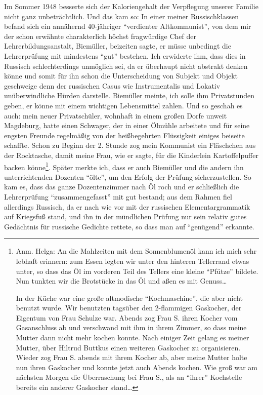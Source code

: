 Im Sommer 1948 besserte sich der Kaloriengehalt der Verpflegung unserer Familie nicht ganz unbeträchtlich. Und das kam so: In einer meiner Russischklassen befand sich ein annähernd 40-jähriger \enquote{verdienter Altkommunist}, von dem mir der schon erwähnte charakterlich höchst fragwürdige Chef der Lehrerbildungsanstalt, Biemüller, beizeiten sagte, er müsse unbedingt die Lehrerprüfung mit mindestens \enquote{gut} bestehen.  Ich erwiderte ihm, dass dies in Russisch schlechterdings unmöglich sei, da er überhaupt nicht abstrakt denken könne und somit für ihn schon die Unterscheidung von Subjekt und Objekt geschweige denn der russischen Casus wie Instrumentalis und Lokativ unüberwindliche Hürden darstelle. Biemüller meinte, ich solle ihm Privatstunden geben, er könne mit einem wichtigen Lebensmittel zahlen. Und so geschah es auch: mein neuer Privatschüler, wohnhaft in einem großen Dorfe unweit Magdeburg, hatte einen Schwager, der in einer Ölmühle arbeitete und für seine engsten Freunde regelmäßig von der heißbegehrten Flüssigkeit einiges beiseite schaffte. Schon zu Beginn der 2. Stunde zog mein Kommunist ein Fläschchen aus der Rocktasche, damit meine Frau, wie er sagte, für die Kinderlein Kartoffelpuffer backen könne\footnote{Anm. Helga: An die Mahlzeiten mit dem Sonnenblumenöl kann ich mich sehr lebhaft erinnern: zum Essen legten wir unter den hinteren Tellerrand etwas unter, so dass das Öl im vorderen Teil des Tellers eine kleine \enquote{Pfütze} bildete. Nun tunkten wir die Brotstücke in das Öl und aßen es mit Genuss\dots
	
	In der Küche war eine große altmodische \enquote{Kochmaschine}, die aber nicht benutzt wurde. Wir benutzten tagsüber den 2-flammigen Gaskocher, der Eigentum von Frau Schulze war. Abends zog Frau S. ihren Kocher vom Gasanschluss ab und verschwand mit ihm in ihrem Zimmer, so dass meine Mutter dann nicht mehr kochen konnte. Nach einiger Zeit gelang es meiner Mutter, über Hiltrud Buttkus einen weiteren Gaskocher zu organisieren. Wieder zog Frau S. abends mit ihrem Kocher ab, aber meine Mutter holte nun ihren Gaskocher und konnte jetzt auch Abends kochen. Wie groß war am nächsten Morgen die Überraschung bei Frau S., als an \enquote{ihrer} Kochstelle bereits ein anderer Gaskocher stand\dots}. Später merkte ich, dass er auch Biemüller und die andern ihn unterrichtenden Dozenten \enquote{ölte}, um den Erfolg der Prüfung sicherzustellen. So kam es, dass das ganze Dozentenzimmer nach Öl roch und er schließlich die Lehrerprüfung \enquote{zusammengefasst} mit gut bestand; aus dem Rahmen fiel allerdings Russisch, da er nach wie vor mit der russischen Elementargrammatik auf Kriegsfuß stand, und ihn in der mündlichen Prüfung nur sein relativ gutes Gedächtnis für russische Gedichte rettete, so dass man auf \enquote{genügend} erkannte.

